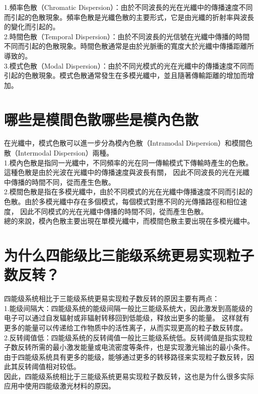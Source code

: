 \documentclass[12pt, a4paper, oneside]{article}
\begin{document}
\begin{spacing}{2.0}
1.頻率色散（Chromatic Dispersion）：由於不同波長的光在光纖中的傳播速度不同而引起的色散現象。頻率色散是光纖色散的主要形式，它是由光纖的折射率與波長的變化而引起的。\\

2.時間色散（Temporal Dispersion）：由於不同波長的光信號在光纖中傳播的時間不同而引起的色散現象。時間色散通常是由於光脈衝的寬度大於光纖中傳播距離所導致的。\\

3.模式色散（Modal Dispersion）：由於不同光模式的光在光纖中的傳播速度不同而引起的色散現象。模式色散通常發生在多模光纖中，並且隨著傳輸距離的增加而增加。\\


\section{哪些是模間色散哪些是模內色散}
在光纖中，模式色散可以進一步分為模內色散（Intramodal Dispersion）和模間色散（Intermodal Dispersion）兩種。\\

1.模內色散是指同一光纖中，不同頻率的光在同一傳輸模式下傳輸時產生的色散。這種色散是由於光波在光纖中的傳播速度與波長有關，
因此不同波長的光在光纖中傳播的時間不同，從而產生色散。
\\
2.模間色散是指在多模光纖中，由於不同模式的光在光纖中傳播速度不同而引起的色散。由於多模光纖中存在多個模式，每個模式對應不同的光傳播路徑和相位速度，
因此不同模式的光在光纖中傳播的時間不同，從而產生色散。
\\
總的來說，模內色散主要出現在單模光纖中，而模間色散主要出現在多模光纖中。

\section{为什么四能级比三能级系统更易实现粒子数反转？}
四能级系统相比于三能级系统更易实现粒子数反转的原因主要有两点：
\\
1.能级间隔大：四能级系统的能级间隔一般比三能级系统大，因此激发到高能级的电子可以通过自发辐射或非辐射转移回到低能级，释放出更多的能量。
这样就有更多的能量可以传递给工作物质中的活性离子，从而实现更高的粒子数反转度。
\\
2.反转阈值低：四能级系统的反转阈值一般比三能级系统低。反转阈值是指实现粒子数反转所需的最小激发能量或电流密度等条件，也是实现激光输出的最小条件。
由于四能级系统具有更多的能级，能够通过更多的转移路径来实现粒子数反转，因此其反转阈值相对较低。
\\
因此，四能级系统相比于三能级系统更易实现粒子数反转，这也是为什么很多实际应用中使用四能级激光材料的原因。

\end{spacing}
\end{document}
